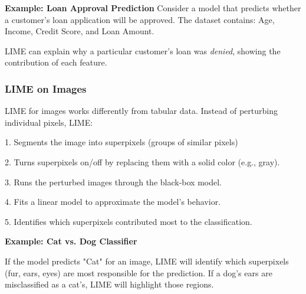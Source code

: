 \textbf{Example: Loan Approval Prediction}
Consider a model that predicts whether a customer’s loan application will be approved. The dataset contains: Age, Income, Credit Score, and Loan Amount.


LIME can explain why a particular customer’s loan was \textit{denied}, showing the contribution of each feature.

\subsubsection{LIME on Images}
LIME for images works differently from tabular data. Instead of perturbing individual pixels, LIME:
\begin{description}
    \item 1. Segments the image into superpixels (groups of similar pixels)
    \item 2. Turns superpixels on/off by replacing them with a solid color (e.g., gray).
    \item 3. Runs the perturbed images through the black-box model.
    \item 4. Fits a linear model to approximate the model's behavior.
    \item 5. Identifies which superpixels contributed most to the classification.
\end{description}


\textbf{Example: Cat vs. Dog Classifier}

If the model predicts "Cat" for an image, LIME will identify which superpixels (fur, ears, eyes) are most responsible for the prediction. If a dog's ears are misclassified as a cat’s, LIME will highlight those regions.



